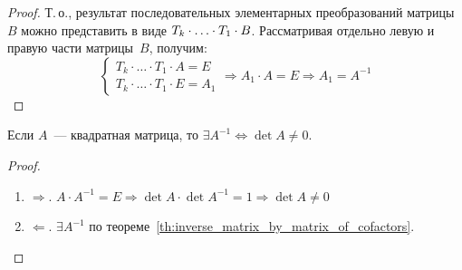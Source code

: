 \begin{proof}
Т.\,о., результат последовательных элементарных преобразований матрицы~$B$ можно представить в виде $T_k \opbr\cdot \ldots \opbr\cdot T_1 \opbr\cdot B$.
Рассматривая отдельно левую и правую части матрицы~$B$, получим:
\begin{equation*}
\begin{cases}
T_k \cdot \ldots \cdot T_1 \cdot A = E \\
T_k \cdot \ldots \cdot T_1 \cdot E = A_1
\end{cases}
\Rightarrow A_1 \cdot A = E \Rightarrow A_1 = A^{-1}
\end{equation*}
\end{proof}

\begin{theorem}
Если $A$~--- квадратная матрица, то $\exists A^{-1} \Leftrightarrow \det A \neq 0$.
\end{theorem}
\begin{proof}
\begin{enumerate}
	\item $\Rightarrow$. $A \cdot A^{-1} = E \Rightarrow
	\det A \cdot \det A^{-1} = 1 \Rightarrow
	\det A \neq 0$
	
	\item $\Leftarrow$. $\exists A^{-1}$ по теореме~\ref*{th:inverse_matrix_by_matrix_of_cofactors}.
\end{enumerate}
\end{proof}